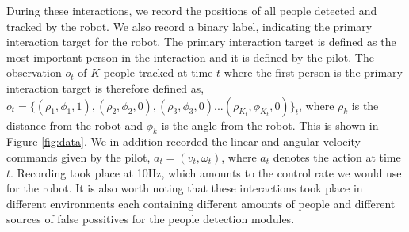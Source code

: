 \documentclass[letterpaper, 10 pt, conference]{ieeeconf}
\begin{document}
During these interactions, we record the positions of all people detected and tracked by the robot. We also record a binary label, indicating the primary interaction target for the robot. The primary interaction target is defined as the most important person in the interaction and it is defined by the pilot. The observation $o_t$ of $K$ people tracked at time $t$ where the first person is the primary interaction target is therefore defined as, $o_t = \{(\rho_1,\phi_1,1), (\rho_2,\phi_2,0),(\rho_3,\phi_3,0) ... (\rho_{K_t},\phi_{K_t},0)\}_t$, where $\rho_k$ is the distance from the robot and $\phi_k$ is the angle from the robot. This is shown in Figure \ref{fig:data}. We in addition recorded the linear and angular velocity commands given by the pilot, $a_t = (v_t,\omega_t)$, where $a_t$ denotes the action at time $t$. Recording took place at 10Hz, which amounts to the control rate we would use for the robot.  It is also worth noting that these interactions took place in different environments each containing different amounts of people and different sources of false possitives for the people detection modules.
\end{document}
